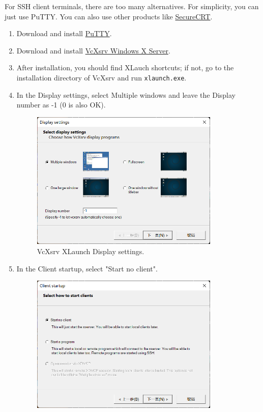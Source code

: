 \documentclass[a4paper,12pt,twoside]{article}
\begin{document}
For SSH client terminals, there are too many alternatives. For simplicity, you can just use PuTTY. You can also use other products like \href{https://www.vandyke.com/products/securecrt/}{SecureCRT}.
\begin{enumerate}
    \item Download and install \href{https://www.chiark.greenend.org.uk/~sgtatham/putty/latest.html}{PuTTY}.
    \item Download and install \href{https://sourceforge.net/projects/vcxsrv/files/latest/download}{VcXsrv Windows X Server}.
    \item After installation, you should find XLauch shortcuts; if not, go to the installation directory of VcXsrv and run \texttt{xlaunch.exe}.
    \item In the Display settings, select Multiple windows and leave the Display number as -1 (0 is also OK).
    \begin{figure}[H]
        \centering
        \includegraphics[width=0.85\textwidth]{images/1.png}
        \caption{VcXsrv XLaunch Display settings.}
    \end{figure}
    \item In the Client startup, select "Start no client".
    \begin{figure}[H]
        \centering
        \includegraphics[width=0.85\textwidth]{images/2.png}

\end{figure}
\end{enumerate}
\end{document}
